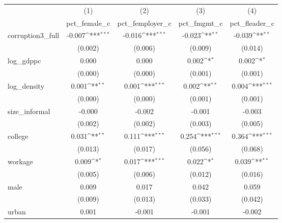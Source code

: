 {
\def\sym#1{\ifmmode^{#1}\else\(^{#1}\)\fi}
\begin{tabular}{l*{4}{c}}
\hline\hline
            &\multicolumn{1}{c}{(1)}&\multicolumn{1}{c}{(2)}&\multicolumn{1}{c}{(3)}&\multicolumn{1}{c}{(4)}\\
            &\multicolumn{1}{c}{pct\_female\_c}&\multicolumn{1}{c}{pct\_femployer\_c}&\multicolumn{1}{c}{pct\_fmgmt\_c}&\multicolumn{1}{c}{pct\_fleader\_c}\\
\hline
corruption3\_full&      -0.007\sym{***}&      -0.016\sym{***}&      -0.023\sym{**} &      -0.039\sym{**} \\
            &     (0.002)         &     (0.006)         &     (0.009)         &     (0.014)         \\
[1em]
log\_gdppc   &       0.000         &       0.000         &       0.002\sym{*}  &       0.002\sym{*}  \\
            &     (0.000)         &     (0.000)         &     (0.001)         &     (0.001)         \\
[1em]
log\_density &       0.001\sym{**} &       0.001\sym{***}&       0.002\sym{**} &       0.004\sym{***}\\
            &     (0.000)         &     (0.000)         &     (0.001)         &     (0.001)         \\
[1em]
size\_informal&      -0.000         &      -0.002         &      -0.001         &      -0.003         \\
            &     (0.002)         &     (0.002)         &     (0.003)         &     (0.005)         \\
[1em]
college     &       0.031\sym{**} &       0.111\sym{***}&       0.254\sym{***}&       0.364\sym{***}\\
            &     (0.013)         &     (0.017)         &     (0.056)         &     (0.068)         \\
[1em]
workage     &       0.009\sym{*}  &       0.017\sym{***}&       0.022\sym{*}  &       0.039\sym{**} \\
            &     (0.005)         &     (0.006)         &     (0.012)         &     (0.016)         \\
[1em]
male        &       0.009         &       0.017         &       0.042         &       0.059         \\
            &     (0.009)         &     (0.013)         &     (0.033)         &     (0.042)         \\
[1em]
urban       &       0.001         &      -0.001         &      -0.001         &      -0.002         \\

\end{tabular}}
